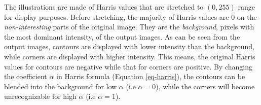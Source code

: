 \documentclass[a4paper, 10pt]{article}
\begin{document}
The illustrations are made of Harris values that are stretched to $(0, 255)$ range for display purposes. Before stretching, the majority of Harris values are $0$ on the \textit{non-interesting} parts of the original image. They are the \textit{background}, pixels with the most dominant intensity, of the output images. As can be seen from the output images, contours are displayed with lower intensity than the background, while corners are displayed with higher intensity. This means, the original Harris values for contours are negative while that for corners are positive. By changing the coefficient $\alpha$ in Harris formula (Equation \ref{eq-harris}), the contours can be blended into the background for low $\alpha$ (i.e $\alpha=0$), while the corners will become unrecognizable for high $\alpha$ (i.e $\alpha=1$).

\begin{lstlisting}[frame=single]
\end{lstlisting}

\begin{lstlisting}[frame=single]
\end{lstlisting}

\begin{lstlisting}[frame=single]
\end{lstlisting}

\begin{lstlisting}[frame=single]
\end{lstlisting}





\begin{lstlisting}[frame=single]
\end{lstlisting}
\end{document}
